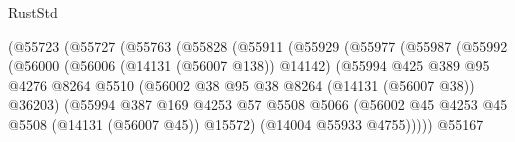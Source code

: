 \begin{lexlean}{RustStd}
\begin{coremodule}
                                    (@55723
                                      (@55727
                                        (@55763
                                          (@55828
                                            (@55911
                                              (@55929
                                                (@55977
                                                  (@55987
                                                    (@55992
                                                      (@56000
                                                        (@56006 (@14131 (@56007 @138)) @14142)
                                                        (@55994
                                                          @425
                                                          @389
                                                          @95
                                                          @4276
                                                          @8264
                                                          @5510
                                                          (@56002
                                                            @38
                                                            @95
                                                            @38
                                                            @8264
                                                            (@14131 (@56007 @38))
                                                            @36203)
                                                          (@55994
                                                            @387
                                                            @169
                                                            @4253
                                                            @57
                                                            @5508
                                                            @5066
                                                            (@56002
                                                              @45
                                                              @4253
                                                              @45
                                                              @5508
                                                              (@14131 (@56007 @45))
                                                              @15572)
                                                            (@14004 @55933 @4755)))))
                                                    @55167

\end{coremodule}
\end{lexlean}
